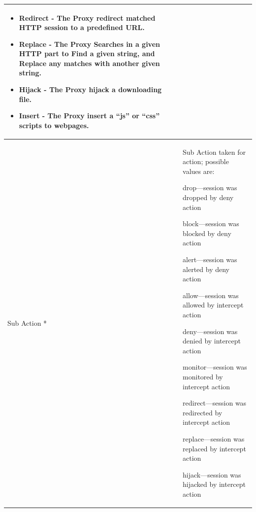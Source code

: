\begin{longtable}{p{}|p{}}
\begin{itemize}
                    \item Redirect - The Proxy redirect matched HTTP session to a predefined URL. 
                    \item Replace - The Proxy Searches in a given HTTP part to Find a given string, and Replace any matches with another given string.     
                    \item Hijack - The Proxy hijack a downloading file. 
                    \item Insert - The Proxy insert a “js” or “css” scripts to webpages. 
                \end{itemize}
                \\\hline
    Sub Action * &	Sub Action taken for action; possible values are:


                    drop—session was dropped by deny action


                    block—session was blocked by deny action


                    alert—session was alerted by deny action


                    allow—session was allowed by intercept action


                    deny—session was denied by intercept action


                    monitor—session was monitored by intercept action


                    redirect—session was redirected by intercept action


                    replace—session was replaced by intercept action


                    hijack—session was hijacked by intercept action



\end{longtable}
